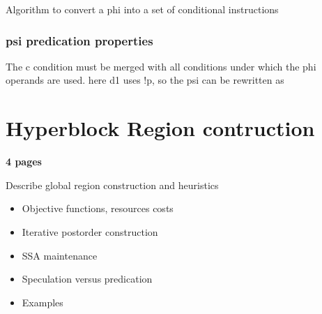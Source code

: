 Algorithm to convert a phi into a set of conditional instructions

\begin{algorithmic}[t]
\STATE
\ENDFOR
\ENDFOR
\end{algorithmic}

\subsubsection{psi predication properties}

The c condition must be merged with all conditions under which the phi operands are used. here d1 uses !p, so the psi can be rewritten as

\section{Hyperblock Region contruction}

\textbf{4 pages}

Describe global region construction and heuristics

    \begin{itemize}

    \item Objective functions, resources costs

    \item Iterative postorder construction

    \item SSA maintenance

    \item Speculation versus predication

    \item Examples

    \end{itemize}




